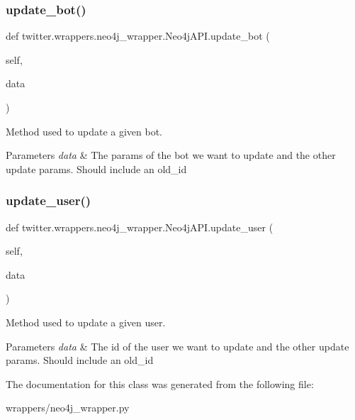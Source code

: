 \subsubsection{\texorpdfstring{update\+\_\+bot()}{update\_bot()}}
{\footnotesize\ttfamily def twitter.\+wrappers.\+neo4j\+\_\+wrapper.\+Neo4j\+A\+P\+I.\+update\+\_\+bot (\begin{DoxyParamCaption}\item[{}]{self,  }\item[{}]{data }\end{DoxyParamCaption})}



Method used to update a given bot. 


\begin{DoxyParams}{Parameters}
{\em data} & The params of the bot we want to update and the other update params. Should include an old\+\_\+id \\
\hline
\end{DoxyParams}
\mbox{\label{classtwitter_1_1wrappers_1_1neo4j__wrapper_1_1Neo4jAPI_a8efba948fa1e68c7b3fe9a604bce53db}} 
\subsubsection{\texorpdfstring{update\+\_\+user()}{update\_user()}}
{\footnotesize\ttfamily def twitter.\+wrappers.\+neo4j\+\_\+wrapper.\+Neo4j\+A\+P\+I.\+update\+\_\+user (\begin{DoxyParamCaption}\item[{}]{self,  }\item[{}]{data }\end{DoxyParamCaption})}



Method used to update a given user. 


\begin{DoxyParams}{Parameters}
{\em data} & The id of the user we want to update and the other update params. Should include an old\+\_\+id \\
\hline
\end{DoxyParams}


The documentation for this class was generated from the following file\+:\begin{DoxyCompactItemize}
\item 
wrappers/neo4j\+\_\+wrapper.\+py\end{DoxyCompactItemize}
